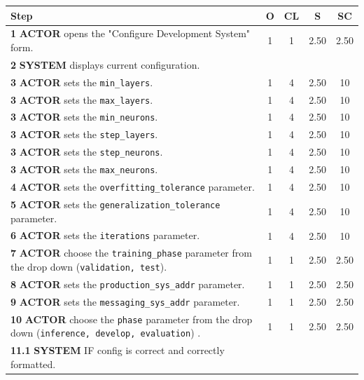 \begin{table}[H]
    \centering
    \begin{tabularx}{\textwidth}{|X|c|c|c|c|}
    \hline
    \textbf{Step} & \textbf{O} & \textbf{CL} & \textbf{S} & \textbf{SC} \\
    \hline
    \textbf{1} \textbf{ACTOR} opens the "Configure Development System" form. & 1 & 1 & 2.50 & 2.50\\
    \hline
    \textbf{2} \textbf{SYSTEM} displays current configuration. & & & & \\
    \hline
    \textbf{3} \textbf{ACTOR} sets the \texttt{min\_layers}. & 1 & 4 & 2.50 & 10 \\
    \hline
    \textbf{3} \textbf{ACTOR} sets the \texttt{max\_layers}. & 1 & 4 & 2.50 & 10 \\
    \hline
    \textbf{3} \textbf{ACTOR} sets the \texttt{min\_neurons}. & 1 & 4 & 2.50 & 10 \\
    \hline
    \textbf{3} \textbf{ACTOR} sets the \texttt{step\_layers}. & 1 & 4 & 2.50 & 10 \\
    \hline
    \textbf{3} \textbf{ACTOR} sets the \texttt{step\_neurons}. & 1 & 4 & 2.50 & 10 \\
    \hline
    \textbf{3} \textbf{ACTOR} sets the \texttt{max\_neurons}. & 1 & 4 & 2.50 & 10 \\
    \hline
    \textbf{4} \textbf{ACTOR} sets the \texttt{overfitting\_tolerance} parameter. & 1 & 4 & 2.50 & 10 \\
    \hline
    \textbf{5} \textbf{ACTOR} sets the \texttt{generalization\_tolerance} parameter. & 1 & 4 & 2.50 & 10 \\
    \hline
    \textbf{6} \textbf{ACTOR} sets the \texttt{iterations} parameter. & 1 & 4 & 2.50 & 10 \\
    \hline
    \textbf{7} \textbf{ACTOR} choose the \texttt{training\_phase} parameter from the drop down (\texttt{validation, test}). & 1 & 1 & 2.50 & 2.50\\
    \hline
    \textbf{8} \textbf{ACTOR} sets the \texttt{production\_sys\_addr} parameter. & 1 & 1 & 2.50 & 2.50 \\
    \hline
    \textbf{9} \textbf{ACTOR} sets the \texttt{messaging\_sys\_addr} parameter. & 1 & 1 & 2.50 & 2.50 \\
    \hline
    \textbf{10} \textbf{ACTOR} choose the \texttt{phase} parameter from the drop down (\texttt{inference, develop, evaluation}) . & 1 & 1 & 2.50 & 2.50 \\
    \hline
    \textbf{11.1} \textbf{SYSTEM} IF config is correct and correctly formatted. & & & & \\

\end{tabularx}
\end{table}
